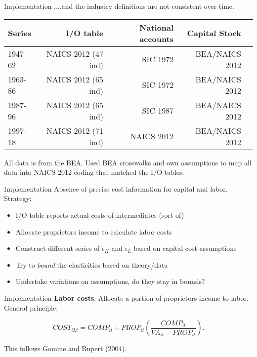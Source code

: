 \documentclass[10pt,xcolor=dvipsnames]{beamer}
\begin{document}
\begin{frame}{Implementation}\label{Smatch}
....and the industry definitions are not consistent over time.

\vspace{.25in}

\begin{tabular}{lrrrr}
Series  & I/O table  & National accounts & Capital Stock \\ \hline
1947-62 & NAICS 2012 (47 ind) & SIC 1972 & BEA/NAICS 2012 \\
1963-86 & NAICS 2012 (65 ind) & SIC 1972 & BEA/NAICS 2012 \\
1987-96 & NAICS 2012 (65 ind) & SIC 1987 & BEA/NAICS 2012 \\
1997-18 & NAICS 2012 (71 ind) & NAICS 2012 & BEA/NAICS 2012 \\ \hline
\end{tabular}

\vspace{.25in} All data is from the BEA. Used BEA crosswalks and own assumptions to map all data into NAICS 2012 coding that matched the I/O tables.

\vspace{.25in} \hfill \hyperlink{Amatch}{}
\end{frame}

\begin{frame}{Implementation}\label{Smakeuse}
Absence of precise cost information for capital and labor. Strategy:

\begin{itemize}
  \item I/O table reports actual costs of intermediates (sort of)
  \item Allocate proprietors income to calculate labor costs
  \item Construct different series of $\epsilon_K$ and $\epsilon_L$ based on capital cost assumptions
  \item Try to \textit{bound} the elasticities based on theory/data
  \item Undertake variations on assumptions, do they stay in bounds?
\end{itemize}
\vspace{.25in} \hfill \hyperlink{Amakeuse}{}
\end{frame}

\begin{frame}{Implementation}
\textbf{Labor costs}: Allocate a portion of proprietors income to labor. General principle:

\begin{equation}
  COST_{iLt} = COMP_{it} + PROP_{it}\left(\frac{COMP_{it}}{VA_{it}-PROP_{it}}\right).
\end{equation}

This follows Gomme and Rupert (2004).

\end{frame}
\end{document}

